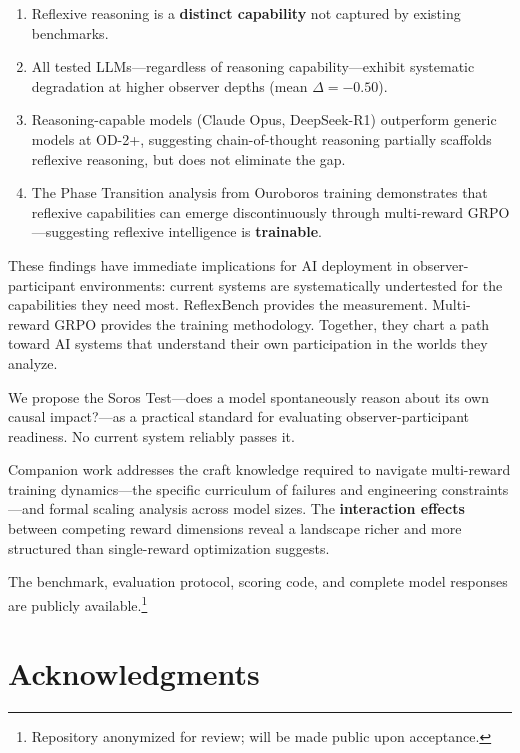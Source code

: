 \documentclass{article}
\begin{document}
\begin{enumerate}[leftmargin=*]
\item Reflexive reasoning is a \textbf{distinct capability} not captured by existing benchmarks.
\item All tested LLMs---regardless of reasoning capability---exhibit systematic degradation at higher observer depths (mean $\Delta = -0.50$).
\item Reasoning-capable models (Claude Opus, DeepSeek-R1) outperform generic models at OD-2+, suggesting chain-of-thought reasoning partially scaffolds reflexive reasoning, but does not eliminate the gap.
\item The Phase Transition analysis from Ouroboros training demonstrates that reflexive capabilities can emerge discontinuously through multi-reward GRPO---suggesting reflexive intelligence is \textbf{trainable}.
\end{enumerate}

These findings have immediate implications for AI deployment in observer-participant environments: current systems are systematically undertested for the capabilities they need most. ReflexBench provides the measurement. Multi-reward GRPO provides the training methodology. Together, they chart a path toward AI systems that understand their own participation in the worlds they analyze.

We propose the Soros Test---does a model spontaneously reason about its own causal impact?---as a practical standard for evaluating observer-participant readiness. No current system reliably passes it.

Companion work addresses the craft knowledge required to navigate multi-reward training dynamics---the specific curriculum of failures and engineering constraints---and formal scaling analysis across model sizes. The \textbf{interaction effects} between competing reward dimensions reveal a landscape richer and more structured than single-reward optimization suggests.

The benchmark, evaluation protocol, scoring code, and complete model responses are publicly available.\footnote{Repository anonymized for review; will be made public upon acceptance.}

\section*{Acknowledgments}
\end{document}
